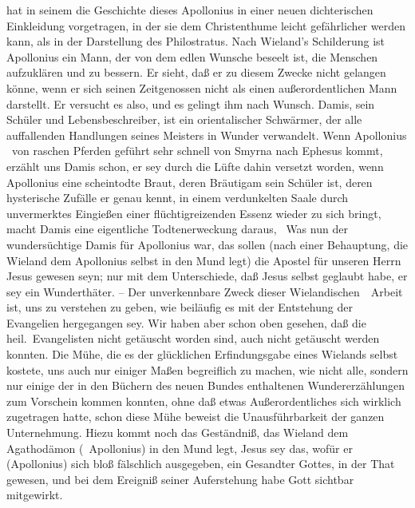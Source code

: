 \begin{RWanm} 
 hat in seinem  die Geschichte dieses Apollonius in einer neuen dichterischen Einkleidung vorgetragen, in der sie dem Christenthume leicht gefährlicher werden kann, als in der Darstellung des Philostratus. Nach Wieland's Schilderung ist Apollonius ein Mann, der von dem edlen Wunsche beseelt ist, die Menschen aufzuklären und zu bessern. Er sieht, daß er zu diesem Zwecke nicht gelangen könne, wenn er sich seinen Zeitgenossen nicht als einen außerordentlichen Mann darstellt. Er versucht es also, und es gelingt ihm nach Wunsch. Damis, sein Schüler und Lebensbeschreiber, ist ein orientalischer Schwärmer, der alle auffallenden Handlungen seines Meisters in Wunder verwandelt. Wenn Apollonius \zB\ von raschen Pferden geführt sehr schnell von Smyrna nach Ephesus kommt, erzählt uns Damis schon, er sey durch die Lüfte dahin versetzt worden, wenn Apollonius eine scheintodte Braut, deren Bräutigam sein Schüler ist, deren hysterische Zufälle er genau kennt, in einem verdunkelten Saale durch unvermerktes Eingießen einer flüchtigreizenden Essenz wieder zu sich bringt, macht Damis eine eigentliche Todtenerweckung daraus, \usw\ Was nun der wundersüchtige Damis für Apollonius war, das sollen (nach einer Behauptung, die Wieland dem Apollonius selbst in den Mund legt) die Apostel für unseren Herrn Jesus gewesen seyn; nur mit dem Unterschiede, daß Jesus selbst geglaubt habe, er sey ein Wunderthäter. -- Der unverkennbare Zweck dieser Wielandischen~\ Arbeit ist, uns zu verstehen zu geben, wie beiläufig es mit der Entstehung der Evangelien hergegangen sey. Wir haben aber schon oben gesehen, daß die heil.\ Evangelisten nicht getäuscht worden sind, auch nicht getäuscht werden konnten. Die Mühe, die es der glücklichen Erfindungsgabe eines Wielands selbst kostete, uns auch nur einiger Maßen begreiflich zu machen, wie nicht alle, sondern nur einige der in den Büchern des neuen Bundes enthaltenen Wundererzählungen zum Vorschein kommen konnten, ohne daß etwas Außerordentliches sich wirklich zugetragen hatte, schon diese Mühe beweist die Unausführbarkeit der ganzen Unternehmung. Hiezu kommt noch das Geständniß, das Wieland dem Agathodämon (\di\ Apollonius) in den Mund legt, Jesus sey das, wofür er (Apollonius) sich bloß fälschlich ausgegeben, ein Gesandter Gottes, in der That gewesen, und bei dem Ereigniß seiner Auferstehung habe Gott sichtbar mitgewirkt.
\end{RWanm}



